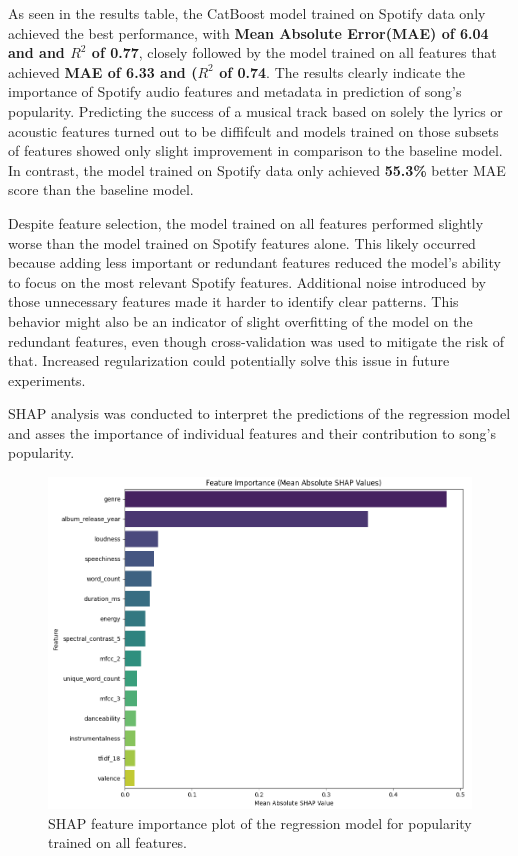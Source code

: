 As seen in the results table, the CatBoost model trained on Spotify data only
achieved the best performance, with \textbf{Mean Absolute Error(MAE) of
\textbf{6.04} and and $R^2$ of 0.77}, closely followed by the model trained on
all features that achieved \textbf{MAE of 6.33 and ($R^2$ of 0.74}. The results
clearly indicate the importance of Spotify audio features and metadata in
prediction of song's popularity. Predicting the success  of a musical track
based on solely the lyrics or acoustic features turned out to be diffifcult and
models trained on those subsets of features showed only slight improvement in
comparison to the baseline model. In contrast, the model trained on Spotify data only
achieved \textbf{55.3\%} better MAE score than the baseline model.

Despite feature selection, the model trained on all features performed slightly
worse than the model trained on Spotify features alone. This likely occurred
because adding less important or redundant features reduced the model's ability
to focus on the most relevant Spotify features. Additional noise introduced by
those unnecessary features made it harder to identify clear patterns. This
behavior might also be an indicator of slight overfitting of the model on the
redundant features, even though cross-validation was used to mitigate the risk
of that. Increased regularization could potentially solve this issue in
future experiments.


SHAP analysis was conducted to interpret the predictions of the regression
model and asses the importance of individual features and their contribution to
song's popularity.


\begin{center}
\begin{figure}[H]
  \centering
  \includegraphics[width=5in]{img/feature_importance_popularity_reg.png}
  \caption{SHAP feature importance plot of the regression model for popularity trained on all features.}
  \label{Figure:fig_beh}
\end{figure}
\end{center}



